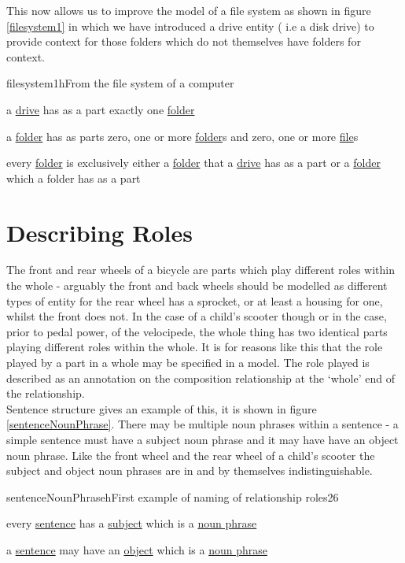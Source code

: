 \noindent This now allows us to improve the model of a file system as shown in 
figure \ref{filesystem1} in which we have introduced a drive entity ( i.e a disk drive) to provide context for those folders which do not themselves have folders for context.
 
\begin{erbulletedFig}{filesystem1}{h}{From the file system of a computer}
\item{a \underline{drive} has as a part exactly one \underline{folder}}
\item{a \underline{folder} has as parts zero, one or more \underline{folder}s 
and zero, one or more \underline{file}s}
\item{every \underline{folder} is exclusively either a \underline{folder} that a \underline{drive}
has as a part or a \underline{folder} which a folder has as a part}
\end{erbulletedFig}




\section{Describing Roles}

The front and rear wheels of a bicycle are parts which play different roles within the whole - arguably 
the front and back wheels should be modelled as different types of entity for the rear wheel has a 
sprocket, or at least a housing for one, whilst the front does not. In the case of a child's scooter though 
or in the case, prior to pedal power, of the velocipede, the whole thing has two identical parts playing 
different roles within the whole. It is for reasons like this that the role played by a part in a whole 
may be specified in a model. The role played is described as an annotation on the composition relationship 
at the `whole' end of the relationship. \\ 

\noindent Sentence structure gives an example of this, it is shown in figure \ref{sentenceNounPhrase}. 
There may be multiple noun phrases within a sentence - a simple sentence must have a 
subject noun phrase 
and it may have have an object noun phrase. Like the front wheel and the rear wheel 
of a child's scooter 
the subject and object noun phrases are in and by themselves indistinguishable. \\

\begin{erbulletedDimFig}{sentenceNounPhrase}{h}{First example of naming of relationship roles}{2}{6}
\item{every \underline{sentence} has a \underline{subject} which is a \underline{noun phrase}}
\item{a \underline{sentence} may have an \underline{object} which is a \underline{noun phrase}}
\end{erbulletedDimFig}


